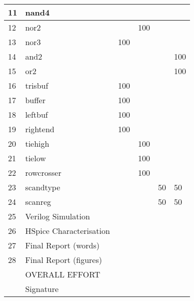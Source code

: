 \documentclass[11pt,a4paper]{article} %
\begin{document}
\begin{appendices}
\begin{table}
\begin{tabular}{l|l|l|l|l|l}
    11 & nand4                   & ~                              & ~       & ~      & ~       \\ \hline
    12 & nor2                    & ~                              & 100     & ~      & ~       \\ \hline
    13 & nor3                    & 100                            & ~       & ~      & ~       \\ \hline
    14 & and2                    & ~                              & ~       & ~      & 100     \\ \hline
    15 & or2                     & ~                              & ~       & ~      & 100     \\ \hline
    16 & trisbuf                 & 100                            & ~       & ~      & ~       \\ \hline
    17 & buffer                  & 100                            & ~       & ~      & ~       \\ \hline
    18 & leftbuf                 & 100                            & ~       & ~      & ~       \\ \hline
    19 & rightend                & 100                            & ~       & ~      & ~       \\ \hline
    20 & tiehigh                 & ~                              & 100     & ~      & ~       \\ \hline
    21 & tielow                  & ~                              & 100     & ~      & ~       \\ \hline
    22 & rowcrosser              & ~                              & 100     & ~      & ~       \\ \hline
    23 & scandtype               & ~                              & ~       & 50     & 50      \\ \hline
    24 & scanreg                 & ~                              & ~       & 50     & 50      \\ \hline
    25 & Verilog Simulation      & ~                              & ~       & ~      & ~       \\ \hline
    26 & HSpice Characterisation & ~                              & ~       & ~      & ~       \\ \hline
    27 & Final Report (words)    & ~                              & ~       & ~      & ~       \\ \hline
    28 & Final Report (figures)  & ~                              & ~       & ~      & ~       \\ \hline
    ~  & OVERALL EFFORT          & ~                              & ~       & ~      & ~       \\ \hline
    ~  & Signature               & ~                              & ~       & ~      & ~       \\ \hline
    \end{tabular}
\end{table}


\end{appendices}
\end{document}
